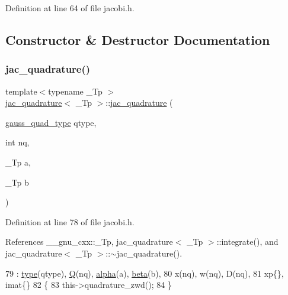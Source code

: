 Definition at line 64 of file jacobi.\+h.



\subsection{Constructor \& Destructor Documentation}
\mbox{\label{structjac__quadrature_a0d4d6c5fbb285c4b6d63e59579bb86a0}} 
\subsubsection{\texorpdfstring{jac\+\_\+quadrature()}{jac\_quadrature()}}
{\footnotesize\ttfamily template$<$typename \+\_\+\+Tp $>$ \\
\hyperlink{structjac__quadrature}{jac\+\_\+quadrature}$<$ \+\_\+\+Tp $>$\+::\hyperlink{structjac__quadrature}{jac\+\_\+quadrature} (\begin{DoxyParamCaption}\item[{\hyperlink{jacobi_8h_a58cc26f41a96f9220797038d2d3b4c8a}{gauss\+\_\+quad\+\_\+type}}]{qtype,  }\item[{int}]{nq,  }\item[{\+\_\+\+Tp}]{a,  }\item[{\+\_\+\+Tp}]{b }\end{DoxyParamCaption})\hspace{0.3cm}{\ttfamily [inline]}}



Definition at line 78 of file jacobi.\+h.



References \+\_\+\+\_\+gnu\+\_\+cxx\+::\+\_\+\+Tp, jac\+\_\+quadrature$<$ \+\_\+\+Tp $>$\+::integrate(), and jac\+\_\+quadrature$<$ \+\_\+\+Tp $>$\+::$\sim$jac\+\_\+quadrature().


\begin{DoxyCode}
79     : \hyperlink{structjac__quadrature_a9af6c3334c23994de4547b9d2631ce28}{type}(qtype), \hyperlink{structjac__quadrature_a91ae5ef05b9ea80951e40cc8a794c834}{Q}(nq), \hyperlink{structjac__quadrature_a24503b91f0dbdc3d3ab3bd802c990e68}{alpha}(a), \hyperlink{structjac__quadrature_ad4fd571dd4977ed96b8155c79367ac41}{beta}(b),
80       x(nq), w(nq), D(nq),
81       xp\{\}, imat\{\}
82     \{
83       this->quadrature\_zwd();
84     \}
\end{DoxyCode}
\mbox{\label{structjac__quadrature_adca300f6457471f03b0392b4d6bc5aea}} 
